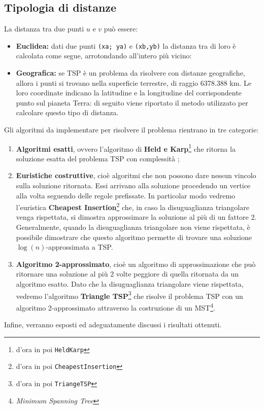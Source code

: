 \subsection{Tipologia di distanze}
\par La distanza tra due punti $u$ e $v$ può essere:
\begin{itemize}
	\item \textbf{Euclidea:} dati due punti \texttt{(xa; ya)} e \texttt{(xb,yb)} la distanza tra di loro è calcolata come segue, arrotondando all'intero più vicino:\\ 
	\item \textbf{Geografica:} se TSP è un problema da risolvere con distanze geografiche, allora i punti si trovano nella superficie terrestre, di raggio 6378.388 km. Le loro coordinate indicano la latitudine e la longitudine del corrispondente punto sul pianeta Terra: di seguito viene riportato il metodo utilizzato per calcolare questo tipo di distanza.\\
\end{itemize}\newpage
Gli algoritmi da implementare per risolvere il problema rientrano in tre categorie:
\begin{enumerate}
	\item \textbf{Algoritmi esatti}, ovvero l'algoritmo di \textbf{Held e Karp}\footnote{d'ora in poi \texttt{HeldKarp}} che ritorna la soluzione esatta del problema TSP con complessità ;
	\item \textbf{Euristiche costruttive}, cioè algoritmi che non possono dare nessun vincolo sulla soluzione ritornata. Essi arrivano alla soluzione procedendo un vertice alla volta seguendo delle regole prefissate. In particolar modo vedremo l'euristica \textbf{Cheapest Insertion}\footnote{d'ora in poi \texttt{CheapestInsertion}} che, in caso la disuguaglianza triangolare venga rispettata, si dimostra approssimare la soluzione al più di un fattore 2. Generalmente, quando la disuguaglianza triangolare non viene rispettata, è possibile dimostrare che questo algoritmo permette di trovare una soluzione $\log (n)$-approssimata a TSP.
	\item \textbf{Algoritmo 2-approssimato}, cioè un algoritmo di approssimazione che può ritornare una soluzione al più 2 volte peggiore di quella ritornata da un algoritmo esatto. Dato che la disuguaglianza triangolare viene rispettata, vedremo l'algoritmo \textbf{Triangle TSP}\footnote{d'ora in poi \texttt{TriangeTSP}} che risolve il problema TSP con un algoritmo 2-approssimato attraverso la costruzione di un MST\footnote{\emph{Minimum Spanning Tree}}.
\end{enumerate}
 Infine, verranno esposti ed adeguatamente discussi i risultati ottenuti.
 
